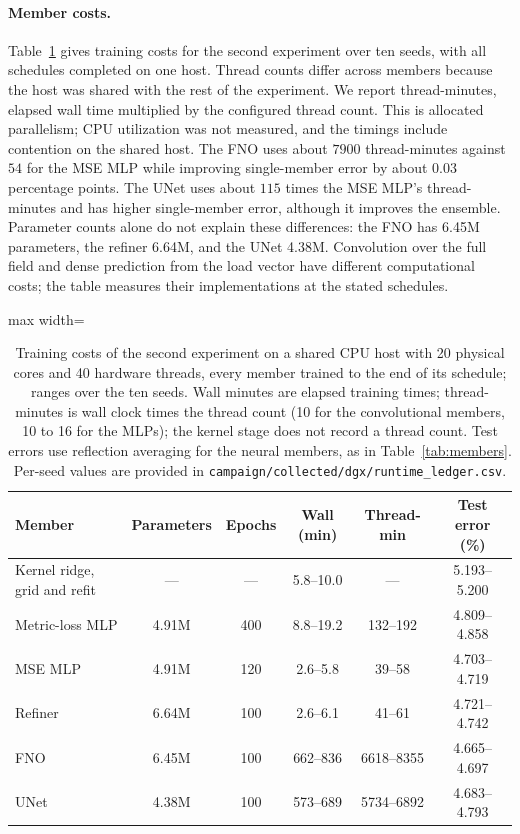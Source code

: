 \paragraph{Member costs.} Table~\ref{tab:memcost} gives training costs
for the second experiment over ten seeds, with all schedules completed
on one host. Thread counts differ across members because the
host was shared with the rest of the experiment. We report thread-minutes,
elapsed wall time multiplied by the configured thread count. This is allocated parallelism; CPU utilization was not measured, and the timings include contention on the shared host. The FNO uses about $7900$ thread-minutes
against $54$ for the MSE MLP while improving single-member error by about
$0.03$ percentage points. The UNet uses about $115$ times the MSE MLP's
thread-minutes and has higher single-member error, although it improves the
ensemble. Parameter counts alone do not explain these differences: the FNO
has 6.45M parameters, the refiner 6.64M, and the UNet 4.38M. Convolution over
the full field and dense prediction from the load vector have different
computational costs; the table measures their implementations at the stated schedules.

\begin{table}[t]
\centering
\caption{Training costs of the second experiment on a shared CPU host with 20 physical cores and 40 hardware threads,
every member trained to the end of its schedule; ranges over the ten seeds.
Wall minutes are elapsed training times; thread-minutes is wall clock
times the thread count (10 for the convolutional members, 10 to 16 for the
MLPs); the kernel stage does not record a
thread count. Test errors use reflection averaging for the neural members,
as in Table~\ref{tab:members}. Per-seed values are provided in
\texttt{campaign/collected/dgx/runtime\_ledger.csv}.}
\label{tab:memcost}
\small
\setlength{\tabcolsep}{4.5pt}
\begin{adjustbox}{max width=\linewidth}
\begin{tabular}{lccccc}
\toprule
Member & Parameters & Epochs & Wall (min) & Thread-min & Test error (\%) \\
\midrule
Kernel ridge, grid and refit & --- & --- & 5.8--10.0 & --- & 5.193--5.200 \\
Metric-loss MLP & 4.91M & 400 & 8.8--19.2 & 132--192 & 4.809--4.858 \\
MSE MLP & 4.91M & 120 & 2.6--5.8 & 39--58 & 4.703--4.719 \\
Refiner & 6.64M & 100 & 2.6--6.1 & 41--61 & 4.721--4.742 \\
FNO & 6.45M & 100 & 662--836 & 6618--8355 & 4.665--4.697 \\
UNet & 4.38M & 100 & 573--689 & 5734--6892 & 4.683--4.793 \\
\bottomrule
\end{tabular}
\end{adjustbox}
\end{table}


